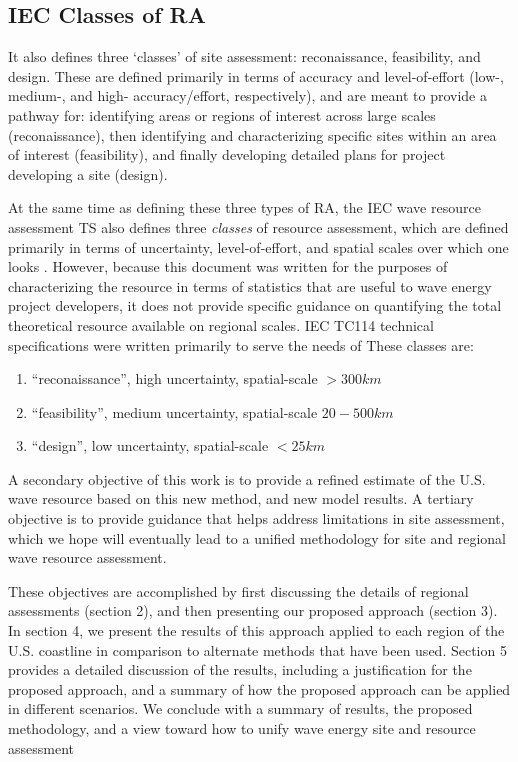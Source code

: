 \subsection{IEC Classes of RA}
It also defines three `classes' of site assessment: reconaissance, feasibility, and design. These are defined primarily in terms of accuracy and level-of-effort (low-, medium-, and high- accuracy/effort, respectively), and are meant to provide a pathway for: identifying areas or regions of interest across large scales (reconaissance), then identifying and characterizing specific sites within an area of interest (feasibility), and finally developing detailed plans for project developing a site (design). 

At the same time as defining these three types of RA, the IEC wave resource assessment TS also defines three {\em classes} of resource assessment, which are defined primarily in terms of uncertainty, level-of-effort, and spatial scales over which one looks \citep{internationalelectrotechnicalcommissionPart101Wave2015}. However, because this document was written for the purposes of characterizing the resource in terms of statistics that are useful to wave energy project developers, it does not provide specific guidance on quantifying the total theoretical resource available on regional scales. 
IEC TC114 technical specifications were written primarily to serve the needs of  These classes are:
\begin{enumerate}
\item ``reconaissance'', high uncertainty, spatial-scale $>300 km$
\item ``feasibility'', medium uncertainty, spatial-scale $20- 500 km$
\item ``design'', low uncertainty, spatial-scale $<25 km$
\end{enumerate}

A secondary objective of this work is to provide a refined estimate of
the U.S. wave resource based on this new method, and new model
results. A tertiary objective is to provide guidance that helps
address limitations in site assessment, which we hope will eventually
lead to a unified methodology for site and regional wave resource
assessment.

These objectives are accomplished by first discussing the details of regional assessments (section 2), and then presenting our proposed approach (section 3). In section 4, we present the results of this approach applied to each region of the U.S. coastline in comparison to alternate methods that have been used. Section 5 provides a detailed discussion of the results, including a justification for the proposed approach, and a summary of how the proposed approach can be applied in different scenarios. We conclude with a summary of results, the proposed methodology, and a view toward how to unify wave energy site and resource assessment



